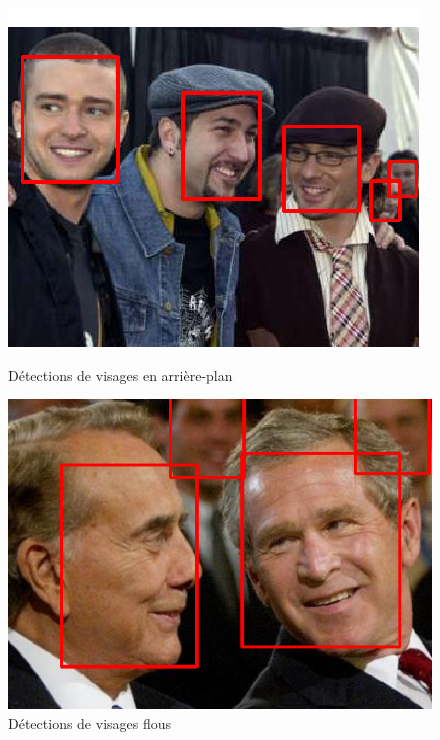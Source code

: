 \documentclass[a4paper,11pt]{article}
\begin{document}
\begin{figure}[H]
    \centering
    \begin{minipage}[c]{0.45\linewidth}
        \begin{center}
            \includegraphics[scale=0.60]{facenetTP1.png}
            \caption{Détections de visages en arrière-plan}
        \end{center}
    \end{minipage} \hfill
    \begin{minipage}[c]{0.45\linewidth}
        \begin{center}
            \includegraphics[scale=0.435]{facenetTP2.png}
            \caption{Détections de visages flous}
            \label{fig:proj_ecran}
        \end{center}
    \end{minipage}
\end{figure}
\end{document}
